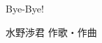 \documentclass[10pt,b5j]{tarticle} %
\begin{document}
\begin{minipage}[c]{0.7\hsize} %
    \begin{center}
        {\LARGE
            Bye-Bye! %
        }
        {\small 
        }
    \end{center}
\end{minipage}
\begin{minipage}[c]{0.3\hsize} %
    \begin{flushright} %
        水野渉君 作歌・作曲 %
    \end{flushright}
\end{minipage}
\end{document}
